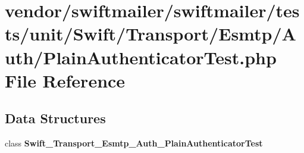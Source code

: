 \section{vendor/swiftmailer/swiftmailer/tests/unit/\+Swift/\+Transport/\+Esmtp/\+Auth/\+Plain\+Authenticator\+Test.php File Reference}
\label{_plain_authenticator_test_8php}
\subsection*{Data Structures}
\begin{DoxyCompactItemize}
\item 
class {\bf Swift\+\_\+\+Transport\+\_\+\+Esmtp\+\_\+\+Auth\+\_\+\+Plain\+Authenticator\+Test}
\end{DoxyCompactItemize}
